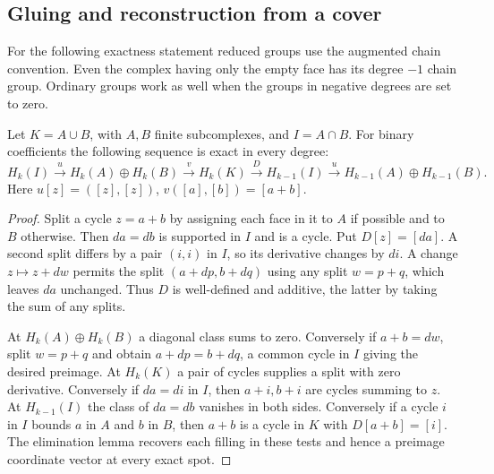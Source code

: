 \subsection{Gluing and reconstruction from a cover}
For the following exactness statement reduced groups use the augmented
chain convention. Even the complex having only the empty face has its
degree $-1$ chain group. Ordinary groups work as well when the groups
in negative degrees are set to zero.

\begin{theorem}\label{idx-algebraic519}
Let $K=A\cup B$, with $A,B$ finite subcomplexes, and $I=A\cap B$.
For binary coefficients the following sequence is exact in every degree:
\[
 H_k(I)\xrightarrow{u} H_k(A)\oplus H_k(B)
 \xrightarrow{v}H_k(K)\xrightarrow{D}H_{k-1}(I)
 \xrightarrow{u} H_{k-1}(A)\oplus H_{k-1}(B).
\]
Here $u[z]=([z],[z])$, $v([a],[b])=[a+b]$.
\end{theorem}
\begin{proof}
Split a cycle $z=a+b$ by assigning each face in it to $A$ if possible
and to $B$ otherwise. Then $da=db$ is supported in $I$ and is a cycle.
Put $D[z]=[da]$. A second split differs by a pair $(i,i)$ in $I$,
so its derivative changes by $di$. A change $z\mapsto z+dw$ permits
the split $(a+dp,b+dq)$ using any split $w=p+q$, which leaves $da$
unchanged. Thus $D$ is well-defined and additive, the latter by taking
the sum of any splits.

At $H_k(A)\oplus H_k(B)$ a diagonal class sums to zero. Conversely if
$a+b=dw$, split $w=p+q$ and obtain $a+dp=b+dq$, a common cycle in
$I$ giving the desired preimage. At $H_k(K)$ a pair of cycles supplies
a split with zero derivative. Conversely if $da=di$ in $I$, then
$a+i,b+i$ are cycles summing to $z$. At $H_{k-1}(I)$ the class of
$da=db$ vanishes in both sides. Conversely if a cycle $i$ in $I$
bounds $a$ in $A$ and $b$ in $B$, then $a+b$ is a cycle in $K$ with
$D[a+b]=[i]$. The elimination lemma recovers each filling in these
tests and hence a preimage coordinate vector at every exact spot.
\end{proof}

